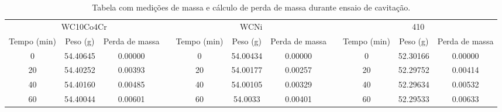 \begin{table}[]
\centering
\caption{Tabela com medições de massa e cálculo de perda de massa durante ensaio de cavitação.}
\label{tab:cav_hvof2}
\begin{tabular}{ccccccccccc}
\cline{1-3} \cline{5-7} \cline{9-11}
\multicolumn{3}{c}{WC10Co4Cr}                                                                           &                       & \multicolumn{3}{c}{WCNi}                                                                               &                       & \multicolumn{3}{c}{410}                                                                                \\ \cline{1-3} \cline{5-7} \cline{9-11} 
\multicolumn{1}{|p{1cm}|}{Tempo (min)} & \multicolumn{1}{p{1.3cm}|}{Peso (g)} &
\multicolumn{1}{p{1.4cm}|}{Perda de massa} & \multicolumn{1}{l|}{} &
\multicolumn{1}{p{1cm}|}{Tempo (min)} & \multicolumn{1}{p{1.3cm}|}{Peso (g)} &
\multicolumn{1}{p{1.4cm}|}{Perda de massa} & \multicolumn{1}{l|}{} &
\multicolumn{1}{p{1cm}|}{Tempo (min)} & \multicolumn{1}{p{1.3cm}|}{Peso (g)} &
\multicolumn{1}{p{1.4cm}|}{Perda de massa} \\ \cline{1-3} \cline{5-7}
\cline{9-11}
\multicolumn{1}{|c|}{0}           & \multicolumn{1}{c|}{54.40645} & \multicolumn{1}{c|}{0.00000}        & \multicolumn{1}{l|}{} & \multicolumn{1}{c|}{0}           & \multicolumn{1}{c|}{54.00434} & \multicolumn{1}{c|}{0.00000}        & \multicolumn{1}{l|}{} & \multicolumn{1}{c|}{0}           & \multicolumn{1}{c|}{52.30166} & \multicolumn{1}{c|}{0.00000}        \\ \cline{1-3} \cline{5-7} \cline{9-11} 
\multicolumn{1}{|c|}{20}          & \multicolumn{1}{c|}{54.40252} & \multicolumn{1}{c|}{0.00393}        & \multicolumn{1}{l|}{} & \multicolumn{1}{c|}{20}          & \multicolumn{1}{c|}{54.00177} & \multicolumn{1}{c|}{0.00257}        & \multicolumn{1}{l|}{} & \multicolumn{1}{c|}{20}          & \multicolumn{1}{c|}{52.29752} & \multicolumn{1}{c|}{0.00414}        \\ \cline{1-3} \cline{5-7} \cline{9-11} 
\multicolumn{1}{|c|}{40}          & \multicolumn{1}{c|}{54.40160} & \multicolumn{1}{c|}{0.00485}        & \multicolumn{1}{l|}{} & \multicolumn{1}{c|}{40}          & \multicolumn{1}{c|}{54.00105} & \multicolumn{1}{c|}{0.00329}        & \multicolumn{1}{l|}{} & \multicolumn{1}{c|}{40}          & \multicolumn{1}{c|}{52.29634} & \multicolumn{1}{c|}{0.00532}        \\ \cline{1-3} \cline{5-7} \cline{9-11} 
\multicolumn{1}{|c|}{60}          & \multicolumn{1}{c|}{54.40044} & \multicolumn{1}{c|}{0.00601}        & \multicolumn{1}{l|}{} & \multicolumn{1}{c|}{60}          & \multicolumn{1}{c|}{54.0033}  & \multicolumn{1}{c|}{0.00401}        & \multicolumn{1}{l|}{} & \multicolumn{1}{c|}{60}          & \multicolumn{1}{c|}{52.29533} & \multicolumn{1}{c|}{0.00633}        \\ \cline{1-3} \cline{5-7} \cline{9-11} 

\end{tabular}
\end{table}
